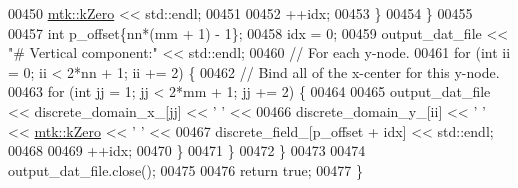 \begin{DoxyCode}
00450           \hyperlink{group__c01-roots_ga59a451a5fae30d59649bcda274fea271}{mtk::kZero} << std::endl;
00451 
00452         ++idx;
00453       \}
00454     \}
00455 
00457     \textcolor{keywordtype}{int} p\_offset\{nn*(mm + 1) - 1\};
00458     idx = 0;
00459     output\_dat\_file << \textcolor{stringliteral}{"# Vertical component:"} << std::endl;
00460     \textcolor{comment}{// For each y-node.}
00461     \textcolor{keywordflow}{for} (\textcolor{keywordtype}{int} ii = 0; ii < 2*nn + 1; ii += 2) \{
00462       \textcolor{comment}{// Bind all of the x-center for this y-node.}
00463       \textcolor{keywordflow}{for} (\textcolor{keywordtype}{int} jj = 1; jj < 2*mm + 1; jj += 2) \{
00464 
00465         output\_dat\_file << discrete\_domain\_x\_[jj] << \textcolor{charliteral}{' '} <<
00466           discrete\_domain\_y\_[ii] << \textcolor{charliteral}{' '} << \hyperlink{group__c01-roots_ga59a451a5fae30d59649bcda274fea271}{mtk::kZero} << \textcolor{charliteral}{' '} <<
00467           discrete\_field\_[p\_offset + idx] << std::endl;
00468 
00469         ++idx;
00470       \}
00471     \}
00472   \}
00473 
00474   output\_dat\_file.close();
00475 
00476   \textcolor{keywordflow}{return} \textcolor{keyword}{true};
00477 \}
\end{DoxyCode}
